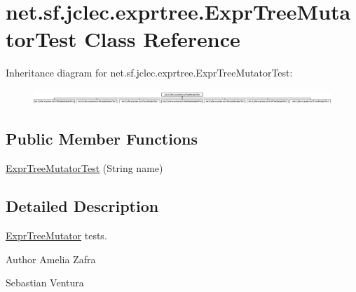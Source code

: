 \hypertarget{classnet_1_1sf_1_1jclec_1_1exprtree_1_1_expr_tree_mutator_test}{\section{net.\-sf.\-jclec.\-exprtree.\-Expr\-Tree\-Mutator\-Test Class Reference}
\label{classnet_1_1sf_1_1jclec_1_1exprtree_1_1_expr_tree_mutator_test}
}
Inheritance diagram for net.\-sf.\-jclec.\-exprtree.\-Expr\-Tree\-Mutator\-Test\-:\begin{figure}[H]
\begin{center}
\leavevmode
\includegraphics[height=0.571429cm]{classnet_1_1sf_1_1jclec_1_1exprtree_1_1_expr_tree_mutator_test}
\end{center}
\end{figure}
\subsection*{Public Member Functions}
\begin{DoxyCompactItemize}
\item 
\hyperlink{classnet_1_1sf_1_1jclec_1_1exprtree_1_1_expr_tree_mutator_test_a8357fb3ebe49293af2ef9c7444283329}{Expr\-Tree\-Mutator\-Test} (String name)
\end{DoxyCompactItemize}


\subsection{Detailed Description}
\hyperlink{classnet_1_1sf_1_1jclec_1_1exprtree_1_1_expr_tree_mutator}{Expr\-Tree\-Mutator} tests.

\begin{DoxyAuthor}{Author}
Amelia Zafra 

Sebastian Ventura 
\end{DoxyAuthor}


